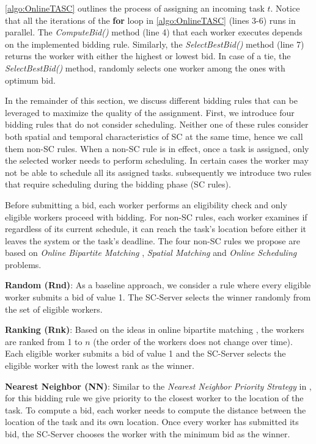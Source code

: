 \cref{algo:OnlineTASC} outlines the process of assigning an incoming task $t$. Notice that all the iterations of the \textbf{for} loop in \cref{algo:OnlineTASC} (lines 3-6) runs in parallel. The \emph{ComputeBid()} method (line 4) that each worker executes depends on the implemented bidding rule. Similarly, the \emph{SelectBestBid()} method (line 7) returns the worker with either the highest or lowest bid. In case of a tie, the \emph{SelectBestBid()} method, randomly selects one worker among the ones with optimum bid.

In the remainder of this section, we discuss different bidding rules that can be leveraged to maximize the quality of the assignment. First, we introduce four bidding rules that do not consider scheduling. Neither one of these rules consider both spatial and temporal characteristics of SC at the same time, hence we call them non-SC rules. When a non-SC rule is in effect, once a task is assigned, only the selected worker needs to perform scheduling. In certain cases the worker may not be able to schedule all its assigned tasks. subsequently we introduce two rules that require scheduling during the bidding phase (SC rules).

Before submitting a bid, each worker performs an eligibility check and only eligible workers proceed with bidding. For non-SC rules, each worker examines if regardless of its current schedule, it can reach the task's location before either it leaves the system or the task's deadline. The four non-SC rules we propose are based on \emph{Online Bipartite Matching} \cite{Karp90}, \emph{Spatial Matching} \cite{Wong07} and \emph{Online Scheduling} \cite{Lee13} problems.

\vspace{0.1in}
\noindent\textbf{Random (Rnd)}:
As a baseline approach, we consider a rule where every eligible worker submits a bid of value 1. The SC-Server selects the winner randomly from the set of eligible workers.

\vspace{0.1in}
\noindent\textbf{Ranking (Rnk)}:
Based on the ideas in online bipartite matching \cite{Karp90}, the workers are ranked from 1 to $n$ (the order of the workers does not change over time). Each eligible worker submits a bid of value 1 and the SC-Server selects the eligible worker with the lowest rank as the winner.

\vspace{0.1in}
\noindent\textbf{Nearest Neighbor (NN)}:
Similar to the \emph{Nearest Neighbor Priority Strategy} in \cite{Kazemi12}, for this bidding rule we give priority to the closest worker to the location of the task. To compute a bid, each worker needs to compute the distance between the location of the task and its own location. Once every worker has submitted its bid, the SC-Server chooses the worker with the minimum bid as the winner.

